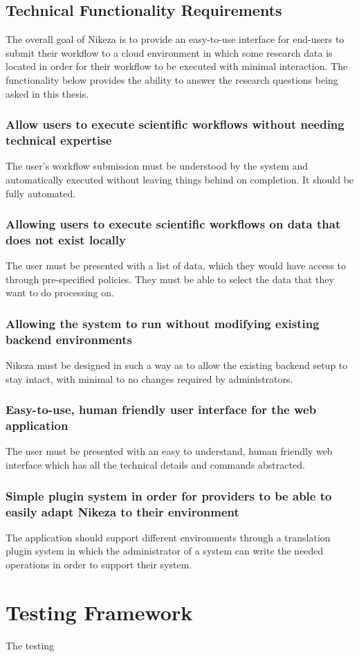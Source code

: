 \subsection{Technical Functionality Requirements}

The overall goal of Nikeza is to provide an easy-to-use interface for end-users to submit their workflow to a cloud environment in which some research data is located in order for their workflow to be executed with minimal interaction. The functionality below provides the ability to answer the research questions being asked in this thesis.

\subsubsection{Allow users to execute scientific workflows without needing technical expertise}

The user's workflow submission must be understood by the system and automatically executed without leaving things behind on completion. It should be fully automated.

\subsubsection{Allowing users to execute scientific workflows on data that does not exist locally}

The user must be presented with a list of data, which they would have access to through pre-specified policies. They must be able to select the data that they want to do processing on.

\subsubsection{Allowing the system to run without modifying existing backend environments}

Nikeza must be designed in such a way as to allow the existing backend setup to stay intact, with minimal to no changes required by administrators. 

\subsubsection{Easy-to-use, human friendly user interface for the web application}

The user must be presented with an easy to understand, human friendly web interface which has all the technical details and commands abstracted.

\subsubsection{Simple plugin system in order for providers to be able to easily adapt Nikeza to their environment}

The application should support different environments through a translation plugin system in which the administrator of a system can write the needed operations in order to support their system.

\section{Testing Framework}
The testing 